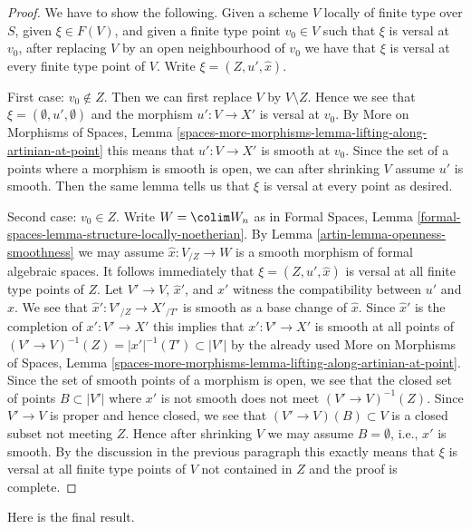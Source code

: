 \begin{proof}

We have to show the following. Given a scheme $V$ locally of finite type over
$S$, given $\xi \in F(V)$, and given a finite type point $v_0 \in V$ such that
$\xi$ is versal at $v_0$, after replacing $V$ by an open neighbourhood
of $v_0$ we have that $\xi$ is versal at every finite type point of $V$.
Write $\xi = (Z, u', \hat x)$.

\medskip\noindent
First case: $v_0 \not \in Z$. Then we can first replace $V$ by
$V \setminus Z$. Hence we see that $\xi = (\emptyset, u', \emptyset)$
and the morphism $u' : V \to X'$ is versal at $v_0$.
By More on Morphisms of Spaces, Lemma
\ref{spaces-more-morphisms-lemma-lifting-along-artinian-at-point}
this means that $u' : V \to X'$ is smooth at $v_0$.
Since the set of a points where a morphism is smooth is open,
we can after shrinking $V$ assume $u'$ is smooth.
Then the same lemma tells us that $\xi$ is versal at every
point as desired.

\medskip\noindent
Second case: $v_0 \in Z$. Write $W = \colim W_n$ as in
Formal Spaces, Lemma \ref{formal-spaces-lemma-structure-locally-noetherian}.
By Lemma \ref{artin-lemma-openness-smoothness} we may assume $\hat x : V_{/Z} \to W$
is a smooth morphism of formal algebraic spaces. It follows immediately
that $\xi = (Z, u', \hat x)$ is versal at all finite type points of $Z$.
Let $V' \to V$, $\hat x'$, and $x'$ witness the compatibility between $u'$
and $\hat x$. We see that $\hat x' : V'_{/Z} \to X'_{/T'}$ is smooth as a
base change of $\hat x$. Since $\hat x'$ is the completion of
$x' : V' \to X'$ this implies that $x' : V' \to X'$ is smooth at all
points of $(V' \to V)^{-1}(Z) = |x'|^{-1}(T') \subset |V'|$
by the already used More on Morphisms of Spaces, Lemma
\ref{spaces-more-morphisms-lemma-lifting-along-artinian-at-point}.
Since the set of smooth points of a morphism is open, we see that
the closed set of points $B \subset |V'|$ where $x'$ is not smooth
does not meet $(V' \to V)^{-1}(Z)$. Since $V' \to V$ is proper and
hence closed, we see that $(V' \to V)(B) \subset V$ is a closed
subset not meeting $Z$. Hence after shrinking $V$ we may assume
$B = \emptyset$, i.e., $x'$ is smooth. By the discussion in the previous
paragraph this exactly means that $\xi$ is versal at all finite type
points of $V$ not contained in $Z$ and the proof is complete.
\end{proof}

Here is the final result.


